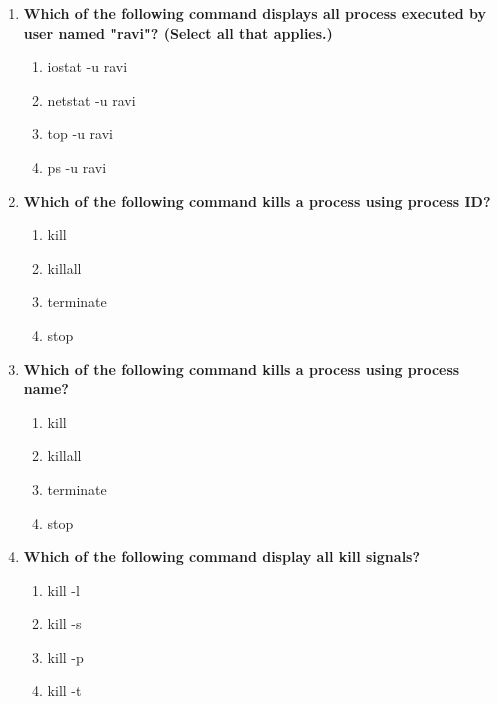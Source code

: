 \begin{flushleft}
\begin{enumerate}
		\item \textbf{Which of the following command displays all process executed by user named "ravi"? (Select all that applies.)}
		\begin{enumerate}[label=(\alph*)]
			\item iostat -u ravi
			\item netstat -u ravi
			\item top -u ravi    %
			\item ps -u ravi   %
		\end{enumerate}
		\bigskip
		\bigskip	
		
		\item \textbf{Which of the following command kills a process using process ID?}
		\begin{enumerate}[label=(\alph*)]
			\item kill  %
			\item killall
			\item terminate
			\item stop
		\end{enumerate}
		\bigskip
		\bigskip	

		\item \textbf{Which of the following command kills a process using process name?}
		\begin{enumerate}[label=(\alph*)]
			\item kill  
			\item killall  %
			\item terminate
			\item stop
		\end{enumerate}
		\bigskip
		\bigskip

		\item \textbf{Which of the following command display all kill signals?}
		\begin{enumerate}[label=(\alph*)]
			\item kill -l  %
			\item kill -s
			\item kill -p
			\item kill -t
		\end{enumerate}
		\bigskip
		\bigskip
		
	\end{enumerate}
	
	
\end{flushleft}

\newpage

